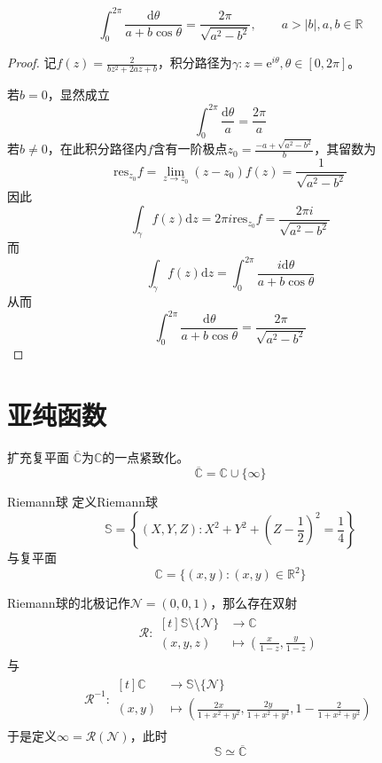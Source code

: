 \documentclass[lang = cn, scheme = chinese, thmcnt = section]{elegantbook}
\newcommand{\R}{\mathbb{R}}            %
\newcommand{\C}{\mathbb{C}}  		   %
\begin{document}
\begin{example}
	$$
	\int_0^{2\pi}\frac{\mathrm{d}\theta}{a+b\cos\theta}=\frac{2\pi}{\sqrt{a^2-b^2}},\qquad a>|b|,a,b\in\R
	$$
\end{example}

\begin{proof}
	记$f(z)=\frac{2}{bz^2+2az+b}$，积分路径为$\gamma:z=\mathrm{e}^{i\theta},\theta\in[0,2\pi]$。
	
	若$b=0$，显然成立
	$$
	\int_0^{2\pi}\frac{\mathrm{d}\theta}{a}=\frac{2\pi}{a}
	$$
	若$b\ne 0$，在此积分路径内$f$含有一阶极点$z_0=\frac{-a+\sqrt{a^2-b^2}}{b}$​，其留数为
	$$
	\mathrm{res}_{z_0}f=\lim_{z\to z_0}(z-z_0)f(z)=\frac{1}{\sqrt{a^2-b^2}}
	$$
	因此
	$$
	\int_{\gamma}f(z)\mathrm{d}z=2\pi i\mathrm{res}_{z_0}f=\frac{2\pi i}{\sqrt{a^2-b^2}}
	$$
	而
	$$
	\int_{\gamma}f(z)\mathrm{d}z=\int_0^{2\pi}\frac{i\mathrm{d}\theta}{a+b\cos\theta}
	$$
	从而
	$$
	\int_0^{2\pi}\frac{\mathrm{d}\theta}{a+b\cos\theta}=\frac{2\pi}{\sqrt{a^2-b^2}}
	$$
\end{proof}

\section{亚纯函数}

\begin{definition}{扩充复平面}
	$\overline{\C}$为$\C$的一点紧致化。
	$$
	\overline{\C}=\C\cup\{ \infty \}
	$$
\end{definition}

\begin{definition}{Riemann球}
	定义Riemann球
	$$
	\mathbb{S}=\left\{ (X,Y,Z):X^2+Y^2+\left(Z-\frac{1}{2}\right)^2=\frac{1}{4} \right\}
	$$
	与复平面
	$$
	\C=\{ (x,y):(x,y)\in\R^2 \}
	$$
	
	Riemann球的北极记作$\mathcal{N}=(0,0,1)$，那么存在双射
	\begin{align*}
		\mathcal{R}:\begin{aligned}[t]
			\mathbb{S}\setminus \{ \mathcal{N} \} &\longrightarrow \C\\
			(x,y,z) &\longmapsto \left(\frac{x}{1-z},\frac{y}{1-z}\right)
		\end{aligned}
	\end{align*}
	与
	\begin{align*}
		\mathcal{R}^{-1}:\begin{aligned}[t]
			\C &\longrightarrow \mathbb{S}\setminus \{ \mathcal{N} \}\\
			(x,y) &\longmapsto \left( \frac{2x}{1+x^2+y^2},\frac{2y}{1+x^2+y^2},1-\frac{2}{1+x^2+y^2} \right)
		\end{aligned}
	\end{align*}
	于是定义$\infty=\mathcal{R}(\mathcal{N})$，此时
	$$
	\mathbb{S}\simeq \overline{\C}
	$$
\end{definition}
\end{document}
